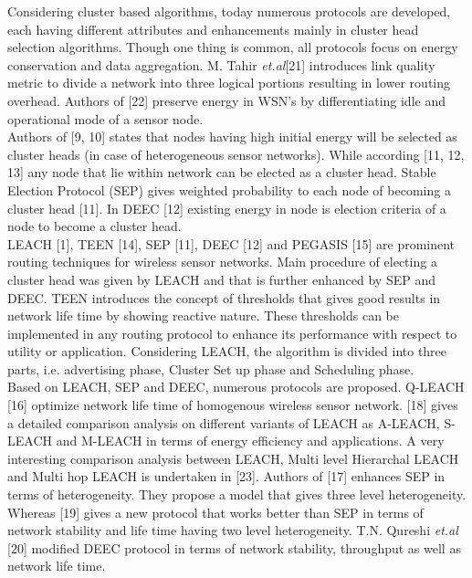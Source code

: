 \documentclass[10pt, conference, compsocconf]{IEEEtran}
\begin{document}
Considering cluster based algorithms, today numerous protocols are developed, each having different attributes and enhancements mainly in cluster head selection algorithms. Though one thing is common, all protocols focus on energy conservation and data aggregation. M. Tahir \emph{et.al}[21] introduces link quality metric to divide a network into three logical portions resulting in lower routing overhead. Authors of [22] preserve energy in WSN's by differentiating idle and operational mode of a sensor node.\\
Authors of [9, 10] states that nodes having high initial energy will be selected as cluster heads (in case of heterogeneous sensor networks). While according [11, 12, 13] any node that lie within network can be elected as a cluster head. Stable Election Protocol (SEP) gives weighted probability to each node of becoming a cluster head [11]. In DEEC [12] existing energy in node is election criteria of a node to become a cluster head.\\
LEACH [1], TEEN [14], SEP [11], DEEC [12] and PEGASIS [15] are prominent routing techniques for wireless sensor networks. Main procedure of electing a cluster head was given by LEACH and that is further enhanced by SEP and DEEC. TEEN introduces the concept of thresholds that gives good results in network life time by showing reactive nature. These thresholds can be implemented in any routing protocol to enhance its performance with respect to utility or application. Considering LEACH, the algorithm is divided into three parts, i.e. advertising phase, Cluster Set up phase and Scheduling phase.\\
Based on LEACH, SEP and DEEC, numerous protocols are proposed. Q-LEACH [16] optimize network life time of homogenous wireless sensor network. [18] gives a detailed comparison analysis on different variants of LEACH as A-LEACH, S-LEACH and M-LEACH in terms of energy efficiency and applications. A very interesting comparison analysis between LEACH, Multi level Hierarchal LEACH and Multi hop LEACH is undertaken in [23]. Authors of [17] enhances SEP in terms of heterogeneity. They propose a model that gives three level heterogeneity. Whereas [19] gives a new protocol that works better than SEP in terms of network stability and life time having two level heterogeneity. T.N. Qureshi \emph{et.al} [20] modified DEEC protocol in terms of network stability, throughput as well as network life time.
\end{document}
